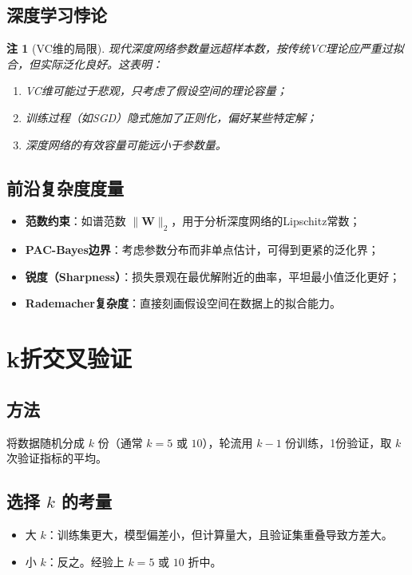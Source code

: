 \documentclass[UTF8, 10pt]{ctexart}
\newtheorem{remark}{注}[section]
\begin{document}
\subsection{深度学习悖论}
\begin{remark}[VC维的局限]
现代深度网络参数量远超样本数，按传统VC理论应严重过拟合，但实际泛化良好。这表明：
\begin{enumerate}
    \item VC维可能过于悲观，只考虑了假设空间的理论容量；
    \item 训练过程（如SGD）隐式施加了正则化，偏好某些特定解；
    \item 深度网络的有效容量可能远小于参数量。
\end{enumerate}
\end{remark}

\subsection{前沿复杂度度量}
\begin{itemize}
    \item \textbf{范数约束}：如谱范数 $\|\bm{W}\|_2$，用于分析深度网络的Lipschitz常数；
    \item \textbf{PAC-Bayes边界}：考虑参数分布而非单点估计，可得到更紧的泛化界；
    \item \textbf{锐度（Sharpness）}：损失景观在最优解附近的曲率，平坦最小值泛化更好；
    \item \textbf{Rademacher复杂度}：直接刻画假设空间在数据上的拟合能力。
\end{itemize}

\section{k折交叉验证}
\subsection{方法}
将数据随机分成 $k$ 份（通常 $k=5$ 或 $10$），轮流用 $k-1$ 份训练，1份验证，取 $k$ 次验证指标的平均。

\subsection{选择 $k$ 的考量}
\begin{itemize}
    \item 大 $k$：训练集更大，模型偏差小，但计算量大，且验证集重叠导致方差大。
    \item 小 $k$：反之。经验上 $k=5$ 或 $10$ 折中。
\end{itemize}
\end{document}
